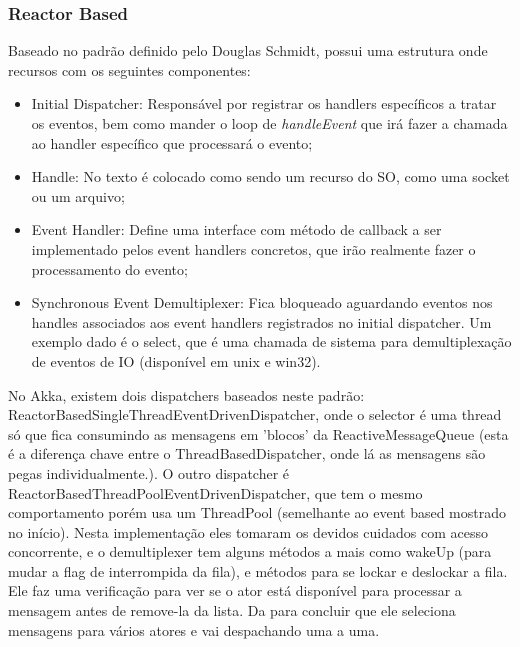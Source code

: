 \documentclass[]{article}
\begin{document}
			\subsubsection{Reactor Based}
			Baseado no padrão definido pelo Douglas Schmidt, possui uma estrutura onde recursos com os seguintes componentes:
			\begin{itemize}
				\item Initial Dispatcher: Responsável por registrar os handlers específicos a tratar os eventos, bem como
				mander o loop de \emph{handleEvent} que irá fazer a chamada ao handler específico que processará o evento;

				\item Handle: No texto é colocado como sendo um recurso do SO, como uma socket ou um arquivo;

				\item Event Handler: Define uma interface com método de callback a ser implementado pelos event handlers concretos,
				que irão realmente fazer o processamento do evento;
				
				\item Synchronous Event Demultiplexer: Fica bloqueado aguardando eventos nos handles associados aos event handlers
				registrados no initial dispatcher. Um exemplo dado é o select, que é uma chamada de sistema para demultiplexação
				de eventos de IO (disponível em unix e win32).
			\end{itemize}
			No Akka, existem dois dispatchers baseados neste padrão: ReactorBasedSingleThreadEventDrivenDispatcher, onde
			o selector é uma thread só que fica consumindo as mensagens em 'blocos' da ReactiveMessageQueue (esta é a diferença
			chave entre o ThreadBasedDispatcher, onde lá as mensagens são pegas individualmente.). O outro dispatcher
			é ReactorBasedThreadPoolEventDrivenDispatcher, que tem o mesmo comportamento porém usa um ThreadPool (semelhante
			ao event based mostrado no início). Nesta implementação eles tomaram os devidos cuidados com acesso concorrente, e
			o demultiplexer tem alguns métodos a mais como wakeUp (para mudar a flag de interrompida da fila), e métodos
			para se lockar e deslockar a fila. Ele faz uma verificação para ver se o ator está disponível para processar a 
			mensagem antes de remove-la da lista. Da para concluir que ele seleciona mensagens para vários atores e vai despachando 
			uma a uma.
\end{document}
